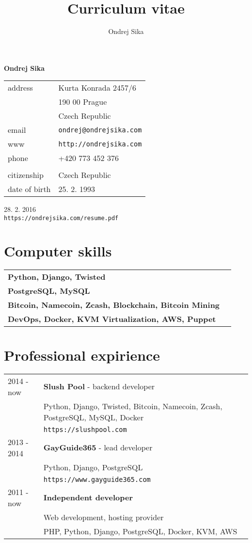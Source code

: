 \documentclass[12pt,a4paper]{article}
\title{Curriculum vitae}
\author{Ondrej Sika}
\begin{document}
\begin{center}
{\LARGE \bf Ondrej Sika}\\
\vspace*{0.2cm}
\begin{tabular}{R{5cm}L{5cm}}
address & Kurta Konrada 2457/6\\
 & 190 00 Prague\\
 & Czech Republic\\
email & \texttt{ondrej@ondrejsika.com}\\
www & \texttt{http://ondrejsika.com}\\
phone & +420 773 452 376\\
\\
citizenship & Czech Republic\\
date of birth & 25. 2. 1993\\
\end{tabular}

\vspace*{0.3cm}
{\hfill 28. 2. 2016}\\
{\hfill \texttt{https://ondrejsika.com/resume.pdf}}
\end{center}

\section*{Computer skills}
\begin{tabular}{@{}ll}
{\bf Python, Django, Twisted} & \\
{\bf PostgreSQL, MySQL} & \\
{\bf Bitcoin, Namecoin, Zcash, Blockchain, Bitcoin Mining} & \\
{\bf DevOps, Docker, KVM Virtualization, AWS, Puppet} & \\
\end{tabular}

\section*{Professional expirience}
\begin{tabular}{@{}p{2cm}l}
2014 - now & {\bf Slush Pool} - backend developer\\
 & Python, Django, Twisted, Bitcoin, Namecoin, Zcash, PostgreSQL, MySQL, Docker\\
 & \texttt{https://slushpool.com}\\
2013 - 2014 & {\bf GayGuide365} - lead developer\\
 & Python, Django, PostgreSQL\\
 & \texttt{https://www.gayguide365.com}\\
2011 - now & {\bf Independent developer}\\
    & Web development, hosting provider\\
    & PHP, Python, Django, PostgreSQL, Docker, KVM, AWS\\
\end{tabular}
\end{document}
